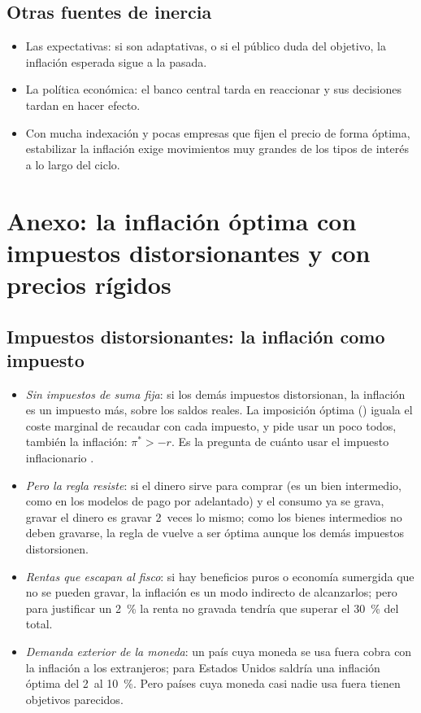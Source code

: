 \documentclass[11pt]{article}
\begin{document}
\subsection{Otras fuentes de inercia}\label{anexo:inercia-otras}

\begin{itemize}
\item Las expectativas: si son adaptativas, o si el público duda del objetivo, la inflación esperada sigue a la pasada.
\item La política económica: el banco central tarda en reaccionar y sus decisiones tardan en hacer efecto.
\item Con mucha indexación y pocas empresas que fijen el precio de forma óptima, estabilizar la inflación exige movimientos muy grandes de los tipos de interés a lo largo del ciclo.
\end{itemize}

\section{Anexo: la inflación óptima con impuestos distorsionantes\cortetitulo{} y con precios rígidos}\label{anexo:inflacion-optima}

\subsection{Impuestos distorsionantes: la inflación como impuesto}\label{anexo:optima-impuestos}

\begin{itemize}
\item \emph{Sin impuestos de suma fija}: si los demás impuestos distorsionan, la inflación es un impuesto más, sobre los saldos reales. La imposición óptima () iguala el coste marginal de recaudar con cada impuesto, y pide usar un poco todos, también la inflación: $\pi^*>-r$\nocite{Phelps1973Inflation}. Es la pregunta de cuánto usar el impuesto inflacionario .
\item \emph{Pero la regla resiste}: si el dinero sirve para comprar (es un bien intermedio, como en los modelos de pago por adelantado) y el consumo ya se grava, gravar el dinero es gravar 2~veces lo mismo; como los bienes intermedios no deben gravarse, la regla de  vuelve a ser óptima aunque los demás impuestos distorsionen\nocite{ChariChristianoKehoe1996Optimality}.
\item \emph{Rentas que escapan al fisco}: si hay beneficios puros o economía sumergida que no se pueden gravar, la inflación es un modo indirecto de alcanzarlos; pero para justificar un 2~\% la renta no gravada tendría que superar el 30~\% del total\nocite{SchmittGroheUribe2010Optimal}.
\item \emph{Demanda exterior de la moneda}: un país cuya moneda se usa fuera cobra con la inflación a los extranjeros; para Estados Unidos saldría una inflación óptima del 2~al 10~\%. Pero países cuya moneda casi nadie usa fuera tienen objetivos parecidos\nocite{SchmittGroheUribe2010Optimal}.
\end{itemize}
\end{document}
